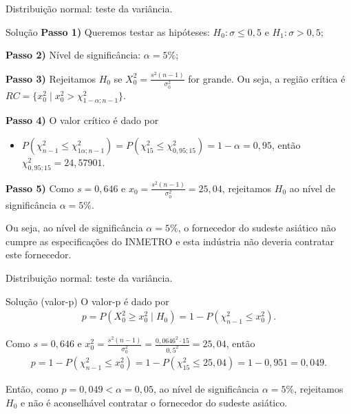 \documentclass[8pt]{beamer}
\begin{document}
\begin{frame}{Distribuição normal: teste da variância.}

	\begin{block}{Solução}
	\textbf{Passo 1)} Queremos testar as hipóteses: $H_0: \sigma \leq 0,5$ e $H_1: \sigma > 0,5$;
	
	\textbf{Passo 2)} Nível de significância: $\alpha=5\%$;
	
	\textbf{Passo 3)} Rejeitamos $H_0$ se $X_0^2=\frac{s^2(n-1)}{\sigma_0^2}$ for grande. Ou seja, a região crítica é $RC=\{ x_0^2 \mid x_0^2 > \chi_{1-\alpha; n-1}^2 \}$.
	
	\textbf{Passo 4)} O valor crítico é dado por 
	\begin{itemize}
		\item $P\left( \chi_{n-1}^2 \leq \chi_{1\alpha;n-1}^2 \right) = P\left( \chi_{15}^2 \leq \chi_{0,95;15}^2 \right) =1- \alpha=0,95$, então $\chi_{0,95;15}^2=24,57901$.
	\end{itemize}
	
	\textbf{Passo 5)} Como $s=0,646$ e $x_0=\frac{s^2(n-1)}{\sigma_0^2}=25,04$, rejeitamos $H_0$ ao nível de significância $\alpha=5\%$.
	
	Ou seja, ao nível de significância $\alpha=5\%$, o fornecedor do sudeste asiático não cumpre as especificações do INMETRO e esta indústria não deveria contratar este fornecedor.
\end{block}

\end{frame}

\begin{frame}{Distribuição normal: teste da variância.}

\begin{block}{Solução (valor-p)}
	O valor-p é dado por
	\begin{align*}
		p = P\left( X_0^2 \geq x_0^2 \mid H_0 \right)=1-P\left( \chi_{n-1}^2 \leq x_0^2 \right).
	\end{align*}
\end{block}
\vfill

Como $s=0,646$ e $x_0^2 = \frac{s^2(n-1)}{\sigma_0^2} = \frac{0,0646^2\cdot  15}{0,5^2} = 25,04$, então 
\begin{align*}
p =1- P\left( \chi_{n-1}^2 \leq x_0^2 \right) =1- P\left( \chi_{15}^2 \leq 25,04 \right) = 1-0,951=0,049.
\end{align*}
\vfill

Então, como $p=0,049 < \alpha=0,05$, ao nível de significância $\alpha=5\%$, rejeitamos $H_0$ e não é aconselhável contratar o fornecedor do sudeste asiático.

\end{frame}
\end{document}

